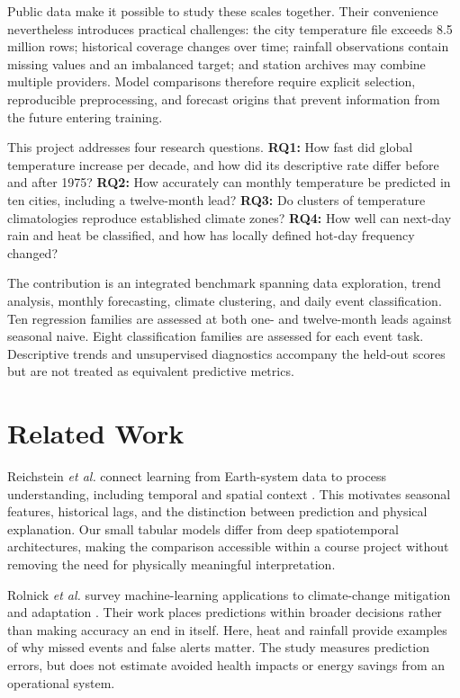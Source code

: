 \documentclass[conference]{IEEEtran}
\begin{document}
Public data make it possible to study these scales together. Their convenience nevertheless introduces practical challenges: the city temperature file exceeds 8.5 million rows; historical coverage changes over time; rainfall observations contain missing values and an imbalanced target; and station archives may combine multiple providers. Model comparisons therefore require explicit selection, reproducible preprocessing, and forecast origins that prevent information from the future entering training.

This project addresses four research questions. \textbf{RQ1:} How fast did global temperature increase per decade, and how did its descriptive rate differ before and after 1975? \textbf{RQ2:} How accurately can monthly temperature be predicted in ten cities, including a twelve-month lead? \textbf{RQ3:} Do clusters of temperature climatologies reproduce established climate zones? \textbf{RQ4:} How well can next-day rain and heat be classified, and how has locally defined hot-day frequency changed?

The contribution is an integrated benchmark spanning data exploration, trend analysis, monthly forecasting, climate clustering, and daily event classification. Ten regression families are assessed at both one- and twelve-month leads against seasonal naive. Eight classification families are assessed for each event task. Descriptive trends and unsupervised diagnostics accompany the held-out scores but are not treated as equivalent predictive metrics.

\section{Related Work}
Reichstein \emph{et al.} connect learning from Earth-system data to process understanding, including temporal and spatial context \cite{reichstein}. This motivates seasonal features, historical lags, and the distinction between prediction and physical explanation. Our small tabular models differ from deep spatiotemporal architectures, making the comparison accessible within a course project without removing the need for physically meaningful interpretation.

Rolnick \emph{et al.} survey machine-learning applications to climate-change mitigation and adaptation \cite{rolnick}. Their work places predictions within broader decisions rather than making accuracy an end in itself. Here, heat and rainfall provide examples of why missed events and false alerts matter. The study measures prediction errors, but does not estimate avoided health impacts or energy savings from an operational system.
\end{document}
